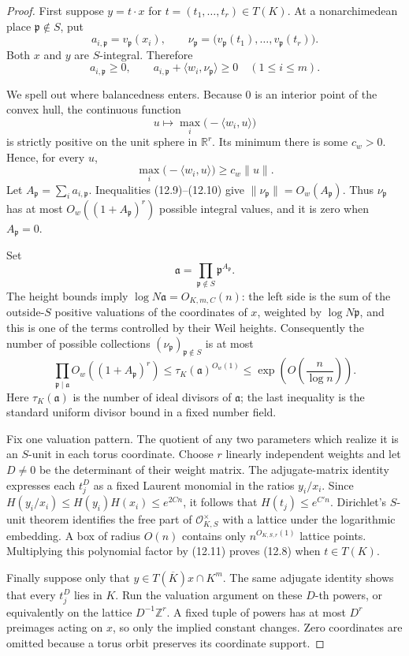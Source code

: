 \documentclass[11pt,reqno]{amsart}
\theoremstyle{definition}
\theoremstyle{remark}
\newcommand{\R}{\mathbb R}
\newcommand{\Z}{\mathbb Z}
\newcommand{\cO}{\mathcal O}
\begin{document}
\begin{proof}
First suppose \(y=t\cdot x\) for \(t=(t_1,\ldots,t_r)\in T(K)\).
At a nonarchimedean place \(\mathfrak p\notin S\), put
\[
 a_{i,\mathfrak p}=v_{\mathfrak p}(x_i),\qquad
 \nu_{\mathfrak p}
 =\bigl(v_{\mathfrak p}(t_1),\ldots,v_{\mathfrak p}(t_r)\bigr).
\]
Both \(x\) and \(y\) are \(S\)-integral.  Therefore
\[
 a_{i,\mathfrak p}\ge0,\qquad
 a_{i,\mathfrak p}
   +\langle w_i,\nu_{\mathfrak p}\rangle\ge0
 \quad(1\le i\le m).
\tag{12.9}
\]

We spell out where balancedness enters.  Because \(0\) is an interior point
of the convex hull, the continuous function
\[
 u\longmapsto\max_i\bigl(-\langle w_i,u\rangle\bigr)
\]
is strictly positive on the unit sphere in \(\R^r\).  Its minimum there is
some \(c_w>0\).  Hence, for every \(u\),
\[
 \max_i\bigl(-\langle w_i,u\rangle\bigr)\ge c_w\lVert u\rVert.
\tag{12.10}
\]
Let \(A_{\mathfrak p}=\sum_i a_{i,\mathfrak p}\).  Inequalities
(12.9)--(12.10) give
\(\lVert\nu_{\mathfrak p}\rVert=O_w(A_{\mathfrak p})\).
Thus \(\nu_{\mathfrak p}\) has at most
\(O_w((1+A_{\mathfrak p})^r)\) possible integral values, and it is zero when
\(A_{\mathfrak p}=0\).

Set
\[
 \mathfrak a=\prod_{\mathfrak p\notin S}
       \mathfrak p^{A_{\mathfrak p}}.
\]
The height bounds imply \(\log N\mathfrak a=O_{K,m,C}(n)\): the left side
is the sum of the outside-\(S\) positive valuations of the coordinates of
\(x\), weighted by \(\log N\mathfrak p\), and this is one of the terms
controlled by their Weil heights.  Consequently the number of possible
collections \((\nu_{\mathfrak p})_{\mathfrak p\notin S}\) is at most
\[
 \prod_{\mathfrak p\mid\mathfrak a}
       O_w((1+A_{\mathfrak p})^r)
 \le \tau_K(\mathfrak a)^{O_w(1)}
 \le\exp\!\left(O\!\left(\frac n{\log n}\right)\right).
\tag{12.11}
\]
Here \(\tau_K(\mathfrak a)\) is the number of ideal divisors of
\(\mathfrak a\); the last inequality is the standard uniform divisor bound
in a fixed number field.

Fix one valuation pattern.  The quotient of any two parameters which realize
it is an \(S\)-unit in each torus coordinate.  Choose \(r\) linearly
independent weights and let \(D\ne0\) be the determinant of their weight
matrix.  The adjugate-matrix identity expresses each \(t_j^D\) as a fixed
Laurent monomial in the ratios \(y_i/x_i\).  Since
\(H(y_i/x_i)\le H(y_i)H(x_i)\le e^{2Cn}\), it follows that
\(H(t_j)\le e^{C'n}\).  Dirichlet's \(S\)-unit theorem identifies the
free part of \(\cO_{K,S}^{\times}\) with a lattice under the logarithmic
embedding.  A box of radius \(O(n)\) contains only \(n^{O_{K,S,r}(1)}\)
lattice points.  Multiplying this polynomial factor by (12.11) proves
(12.8) when \(t\in T(K)\).

Finally suppose only that \(y\in T(\overline K)x\cap K^m\).  The same
adjugate identity shows that every \(t_j^D\) lies in \(K\).  Run the valuation
argument on these \(D\)-th powers, or equivalently on the lattice
\(D^{-1}\Z^r\).  A fixed tuple of powers has at most \(D^r\) preimages acting
on \(x\), so only the implied constant changes.  Zero coordinates are
omitted because a torus orbit preserves its coordinate support.
\end{proof}
\end{document}
